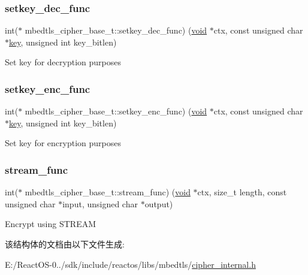\subsubsection{\texorpdfstring{setkey\+\_\+dec\+\_\+func}{setkey\_dec\_func}}
{\footnotesize\ttfamily int($\ast$ mbedtls\+\_\+cipher\+\_\+base\+\_\+t\+::setkey\+\_\+dec\+\_\+func) (\hyperlink{interfacevoid}{void} $\ast$ctx, const unsigned char $\ast$\hyperlink{structkey}{key}, unsigned int key\+\_\+bitlen)}

Set key for decryption purposes \mbox{\label{structmbedtls__cipher__base__t_a775aad5b31782d29bb0fd9414c366a6a}} 
\subsubsection{\texorpdfstring{setkey\+\_\+enc\+\_\+func}{setkey\_enc\_func}}
{\footnotesize\ttfamily int($\ast$ mbedtls\+\_\+cipher\+\_\+base\+\_\+t\+::setkey\+\_\+enc\+\_\+func) (\hyperlink{interfacevoid}{void} $\ast$ctx, const unsigned char $\ast$\hyperlink{structkey}{key}, unsigned int key\+\_\+bitlen)}

Set key for encryption purposes \mbox{\label{structmbedtls__cipher__base__t_a52099766d7c09f16e702d78b6819d9e9}} 
\subsubsection{\texorpdfstring{stream\+\_\+func}{stream\_func}}
{\footnotesize\ttfamily int($\ast$ mbedtls\+\_\+cipher\+\_\+base\+\_\+t\+::stream\+\_\+func) (\hyperlink{interfacevoid}{void} $\ast$ctx, size\+\_\+t length, const unsigned char $\ast$input, unsigned char $\ast$output)}

Encrypt using S\+T\+R\+E\+AM 

该结构体的文档由以下文件生成\+:\begin{DoxyCompactItemize}
\item 
E\+:/\+React\+O\+S-\/0../sdk/include/reactos/libs/mbedtls/\hyperlink{cipher__internal_8h}{cipher\+\_\+internal.\+h}\end{DoxyCompactItemize}
